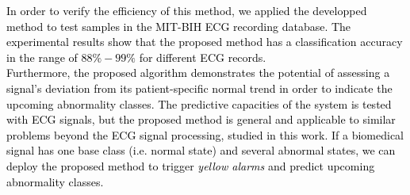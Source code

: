 \textcolor{black}{%
In order to verify the efficiency of this method, we applied the developped method to test samples in the MIT-BIH ECG recording database\cite{mitdb}. The experimental results show that the proposed method has a classification accuracy in the range of $88\%-99\%$ for different ECG records.\\
Furthermore, the proposed algorithm demonstrates the potential of assessing a signal's deviation from its patient-specific normal trend in order to indicate the upcoming abnormality classes. The predictive capacities of the system is tested with ECG signals, but the proposed method is general and applicable to similar problems beyond the ECG signal processing, studied in this work. If a biomedical signal has one base class (i.e. normal state) and several abnormal states, we can deploy the proposed method to trigger \textit{yellow alarms} and predict upcoming abnormality classes.}
  

